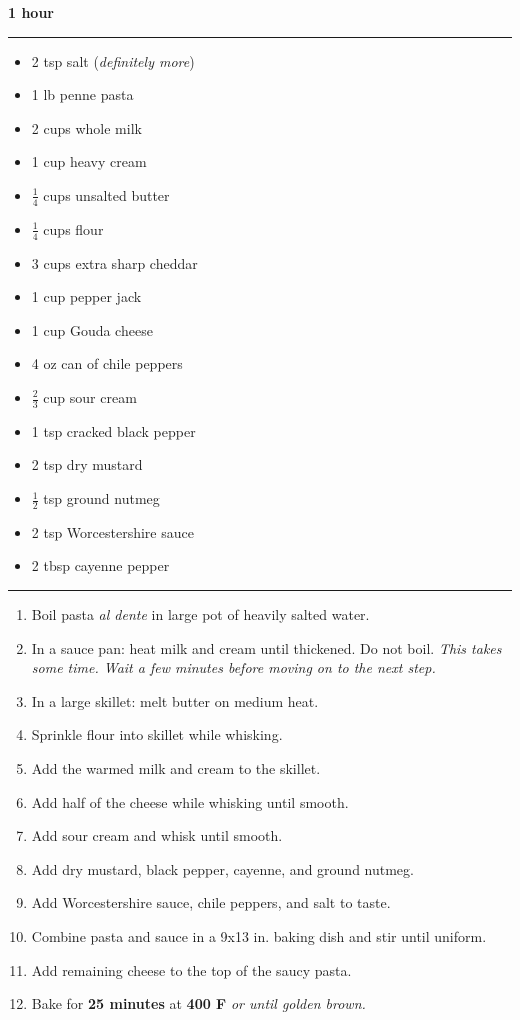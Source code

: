  \hfill {\large \textbf{1 hour}}

\vspace{15pt} \hrule \vspace{15pt}
\begin{itemize}
	\item 2 tsp salt (\textit{definitely more})
	\item 1 lb penne pasta
	\item 2 cups whole milk
	\item 1 cup heavy cream
	\item $\frac{1}{4}$ cups unsalted butter
	\item $\frac{1}{4}$ cups flour
	\item 3 cups extra sharp cheddar
	\item 1 cup pepper jack
	\item 1 cup Gouda cheese
	\item 4 oz can of chile peppers
	\item $\frac{2}{3}$ cup sour cream
	\item 1 tsp cracked black pepper
	\item 2 tsp dry mustard
	\item $\frac{1}{2}$ tsp ground nutmeg
	\item 2 tsp Worcestershire sauce
	\item 2 tbsp cayenne pepper
\end{itemize}

\vspace{15pt} \hrule \vspace{15pt}
\begin{enumerate}
	\item Boil pasta \textit{al dente} in large pot of heavily salted water.
	\item In a sauce pan: heat milk and cream until thickened. Do not boil. \textit{This takes some time. Wait a few minutes before moving on to the next step.}
	\item In a large skillet: melt butter on medium heat.
	\item Sprinkle flour into skillet while whisking.
	\item Add the warmed milk and cream to the skillet.
	\item Add half of the cheese while whisking until smooth.
	\item Add sour cream and whisk until smooth.
	\item Add dry mustard, black pepper, cayenne, and ground nutmeg.
	\item Add Worcestershire sauce, chile peppers, and salt to taste.
	\item Combine pasta and sauce in a 9x13 in. baking dish and stir until uniform.
	\item Add remaining cheese to the top of the saucy pasta.
	\item Bake for \textbf{25 minutes} at \textbf{400 F} \textit{or until golden brown.}
\end{enumerate}
